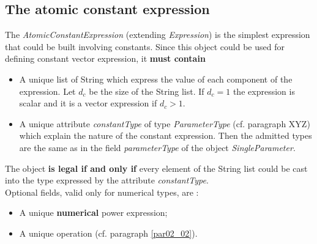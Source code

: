 \documentclass[a4paper,11pt] {article}
\begin{document}
\subsection{The atomic constant expression}\label{par02_03}
The {\it AtomicConstantExpression} (extending {\it Expression}) is the simplest expression that could be built involving constants. Since this object could be used for defining constant vector expression, it {\bf must contain} 
\begin{itemize}
\item A unique list of String which express the value of each component of the expression. Let $d_c$ be the size of the String list. If $d_c=1$ the expression is scalar and it is a vector expression if $d_c>1$. 
\item A unique attribute {\it constantType} of type {\it ParameterType} (cf. paragraph XYZ) which explain the nature of the constant expression. Then the admitted types are the same as in the field {\it parameterType} of the object {\it SingleParameter}. 
\end{itemize}
The object {\bf is legal if and only if} every element of the String list could be cast into the type expressed by the attribute {\it constantType}.\\

Optional fields, valid only for numerical types, are : 
\begin{itemize}
\item A unique {\bf numerical} power expression;
\item A unique operation (cf. paragraph \ref{par02_02}).
\end{itemize}
\end{document}
